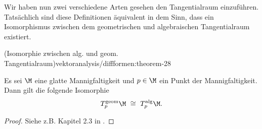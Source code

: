 \documentclass[letterpaper,10pt,english]{jupyterBook}
\begin{document}
\par
Wir haben nun zwei verschiedene Arten gesehen den Tangentialraum einzuführen.
Tatsächlich sind diese Definitionen äquivalent in dem Sinn, dass ein Isomorphismus zwischen dem geometrischen und algebraischen Tangentialraum existiert.
\begin{theorem}{(Isomorphie zwischen alg. und geom. Tangentialraum)}{vektoranalysis/diffformen:theorem-28}



\par
Es sei \(\M\) eine glatte Mannigfaltigkeit und \(p\in\M\) ein Punkt der Mannigfaltigkeit.
Dann gilt die folgende Isomorphie
\begin{align*}
T^{\text{geom}}_p\M \ \cong \ T^{\text{alg}}_p\M.
\end{align*}\end{theorem}

\begin{proof}
 Siehe z.B. Kapitel 2.3 in \cite{Janich03}.
\end{proof}
\end{document}
